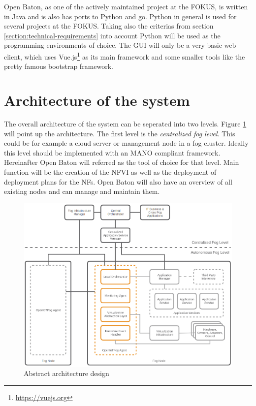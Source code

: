 Open Baton, as one of the actively maintained project at the \ac{FOKUS}, is written in Java and is also has ports to Python and go.
Python in general is used for several projects at the \ac{FOKUS}.
Taking also the criterias from section \ref{section:technical-requirements} into account Python will be used as the  programming environments of choice.
The \ac{GUI} will only be a very basic web client, which uses Vue.js\footnote{\url{https://vuejs.org}} as its main framework and some smaller tools like the pretty famous bootstrap framework.

\section{Architecture of the system}
The overall architecture of the system can be seperated into two levels.
Figure \ref{fig:abstract_architecture_design} will point up the architecture.
The first level is the \textit{centralized fog level}.
This could be for example a cloud server or management node in a fog cluster.
Ideally this level should be implemented with an \ac{MANO} compliant framework.
Hereinafter Open Baton will referred as the tool of choice for that level.
Main function will be the creation of the \ac{NFVI} as well as the deployment of deployment plans for the \acp{NF}.
Open Baton will also have an overview of all existing nodes and can manage and maintain them.

\begin{figure}[H]
    \centering
    \includegraphics[width=\textwidth]{resources/images/initial_structure.png}
    \caption[Abstract architecture design]{Abstract architecture design}
    \label{fig:abstract_architecture_design}
\end{figure}

